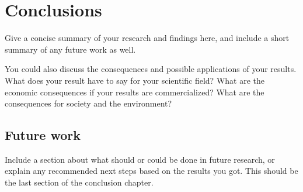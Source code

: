 \chapter{Conclusions}

Give a concise summary of your research and findings here, and include a short summary of any future work as well.

You could also discuss the consequences and possible applications of your results. What does your result have to say for your scientific field? What are the economic consequences if your results are commercialized? What are the consequences for society and the environment?

\section{Future work}

Include a section about what should or could be done in future research, or explain any recommended next steps based on the results you got. This should be the last section of the conclusion chapter.